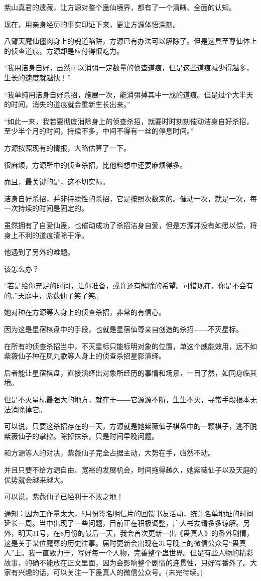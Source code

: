 \begin{this_body}
紫山真君的遗藏，让方源对整个蛊仙境界，都有了一个清晰、全面的认知。

现在，用亲身经历的事实印证下来，更让方源体悟深刻。

八臂天魔仙僵肉身上的魂道陷阱，方源已有办法可以解除了。但是这具至尊仙体上的侦查道痕，方源却是应付得很吃力。

“我用洁身自好，虽然可以消弭一定数量的侦查道痕，但是这些道痕减少得越多，生长的速度就越快！”

“我单纯用洁身自好杀招，施展一次，能消弭掉其中一成的道痕。但是过个大半天的时间，消失的道痕就会重新生长出来。”

“如此一来，我若要彻底消除身上的侦查杀招，就要时时刻刻催动洁身自好杀招，至少半个月的时间，持续不多，中间不得有一丝的停息时间。”

方源按照现有的情报，大略估算了一下。

很麻烦，方源所中的侦查杀招，比他料想中还要麻烦得多。

而且，最关键的是，这不切实际。

洁身自好杀招，并非持续性的杀招，它是按照次数来的。催动一次，就是一次，每一次持续的时间是固定的。

虽然拥有了自爱仙蛊，也催动成功了杀招洁身自爱，但是方源并没有如愿以偿，将身上不利的道痕清除干净。

他遇到了另外的难题。

该怎么办？

“若是给你充足的时间，让你准备，或许还有解除的希望。可惜现在，你是不会有的。”天庭中，紫薇仙子笑了笑。

她对种在方源等人身上的侦查杀招，非常的有信心。

因为这是星宿棋盘中的手段，也就是星宿仙尊亲自创造的杀招――不灭星标。

在所有的侦查杀招当中，不灭星标只能标明对象的位置，单这个威能效用，远不如紫薇仙子种在凤九歌等人身上的侦查杀招星影演绎。

后者能让星宿棋盘，直接演绎出对象所经历的事情和场景，一目了然，如同身临其境。

但是不灭星标最强大的地方，就在于――它源源不断，生生不灭，寻常手段根本无法消除掉它。

可以说，只要这杀招存在的一天，方源就是她紫薇仙子棋盘中的一颗棋子，逃不脱紫薇仙子的掌控。除掉抹杀，只是时间早晚问题。

和方源等人的对决，紫薇仙子完全占据主动，大势在手，岿然不动。

并且只要不给方源自由、宽裕的发展机会，时间拖得越久，她紫薇仙子以及天庭的优势就会越来越大。

可以说，紫薇仙子已经利于不败之地！

通知：因为工作量太大，8月份签名明信片的回馈书友活动，统计名单地址的时间延长一周。当中出现了一些问题，目前正在积极调整，广大书友请多多谅解。另外，明天31号，在8月份的最后一天，我会首次更新一出《蛊真人》的番外剧情，这是关于某位魔尊的历史往事。届时更新会出现在31号晚上的微信公众号“蛊真人”上。我一直致力于，写好每一个人物，完善整个蛊世界。但是有些人物的精彩故事，的确不能放在正文里面，因为会影响整个剧情的连贯性，只好写番外了。大家有兴趣的话，可以关注一下蛊真人的微信公众号。(未完待续。)

\end{this_body}

